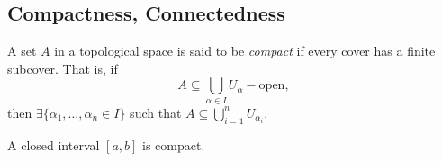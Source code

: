 \subsection{Compactness, Connectedness}

\begin{definition}[Compact]
        A set $A$ in a topological space is said to be \emph{compact} if every cover has a finite subcover. That is, if \[
        A \subseteq \bigcup_{\alpha \in I} U_\alpha-\text{open},    
        \]
        then $\exists \{\alpha_1, \dots, \alpha_n \in I\}$ such that $A \subseteq \bigcup_{i=1}^n U_{\alpha_i}$.
\end{definition}

\begin{proposition}\label{prop:closedcompact}
    A closed interval $[a, b]$ is compact.
\end{proposition}


